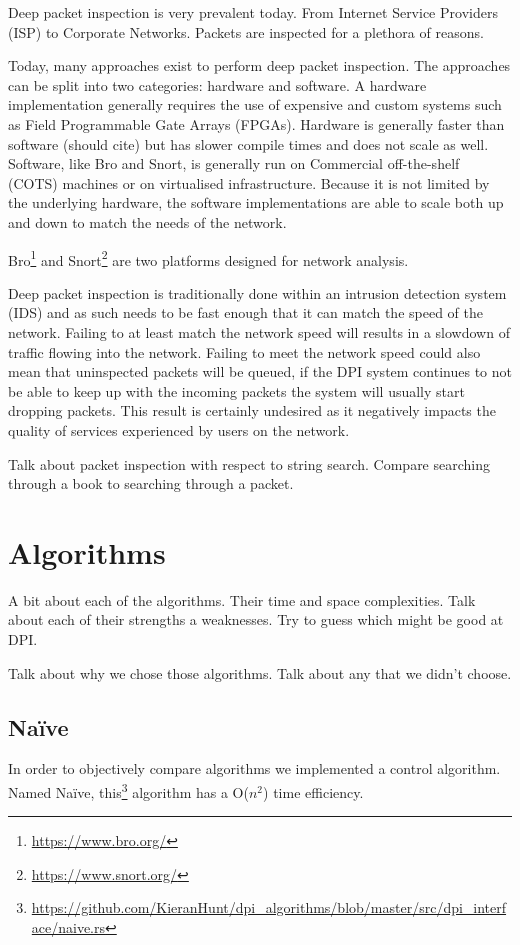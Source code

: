 \documentclass{article}
\begin{document}
Deep packet inspection is very prevalent today. From Internet Service Providers (ISP) to Corporate Networks. Packets are inspected for a plethora of reasons. 

Today, many approaches exist to perform deep packet inspection. The approaches can be split into two categories: hardware and software. A hardware implementation generally requires the use of expensive and custom systems such as Field Programmable Gate Arrays (FPGAs). Hardware is generally faster than software (should cite) but has slower compile times and does not scale as well. Software, like Bro and Snort, is generally run on Commercial off-the-shelf (COTS) machines or on virtualised infrastructure. Because it is not limited by the underlying hardware, the software implementations are able to scale both up and down to match the needs of the network.

Bro\footnote{\url{https://www.bro.org/}} and Snort\footnote{\url{https://www.snort.org/}} are two platforms designed for network analysis.

Deep packet inspection is traditionally done within an intrusion detection system (IDS) and as such needs to be fast enough that it can match the speed of the network. Failing to at least match the network speed will results in a slowdown of traffic flowing into the network. Failing to meet the network speed could also mean that uninspected packets will be queued, if the DPI system continues to not be able to keep up with the incoming packets the system will usually start dropping packets. This result is certainly undesired as it negatively impacts the quality of services experienced by users on the network.  

Talk about packet inspection with respect to string search. Compare searching through a book to searching through a packet.

\section{Algorithms} \label{algorithms}

A bit about each of the algorithms. Their time and space complexities. Talk about each of their strengths a weaknesses. Try to guess which might be good at DPI.

Talk about why we chose those algorithms. Talk about any that we didn't choose.

\subsection{Na{\"i}ve}
In order to objectively compare algorithms we implemented a control algorithm. Named Na{\"i}ve, this\footnote{\url{https://github.com/KieranHunt/dpi_algorithms/blob/master/src/dpi_interface/naive.rs}} algorithm has a O(\(n^2\)) time efficiency. 
\end{document}
